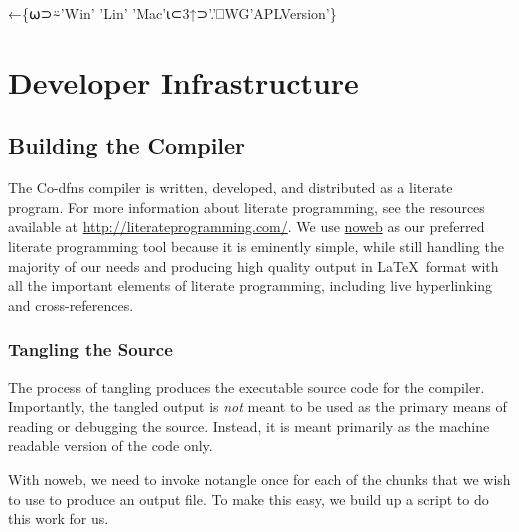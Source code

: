 \documentclass{article}%
\begin{document}
\nwenddocs{}\endmoddef\nwstartdeflinemarkup{}\nwenddeflinemarkup
{}←\{⍵⊃⍨'Win' 'Lin' 'Mac'⍳⊂3↑⊃'.'⎕WG'APLVersion'\}
\eatline
{}\nwendcode{}\nwdocspar
\section{Developer Infrastructure}

\subsection{Building the Compiler}

The Co-dfns compiler is written, developed, and distributed as a
literate program.
For more information about literate programming,
see the resources available at \url{http://literateprogramming.com/}.
We use \href{https://www.cs.tufts.edu/~nr/noweb/}{noweb} as our
preferred literate programming tool because it is eminently simple,
while still handling the majority of our needs and producing high
quality output in \LaTeX\ format with all the important elements of
literate programming, including live hyperlinking and cross-references.

\subsubsection{Tangling the Source}

The process of tangling produces the executable source code 
for the compiler.
Importantly, the tangled output is \emph{not} meant to be used 
as the primary means of reading or debugging the source.
Instead, it is meant primarily as the machine readable version
of the code only.

With noweb, we need to invoke {\Tt{}notangle\nwendquote} once for each of the 
chunks that we wish to use to produce an output file.
To make this easy, we build up a script to do this work for us.
\end{document}
